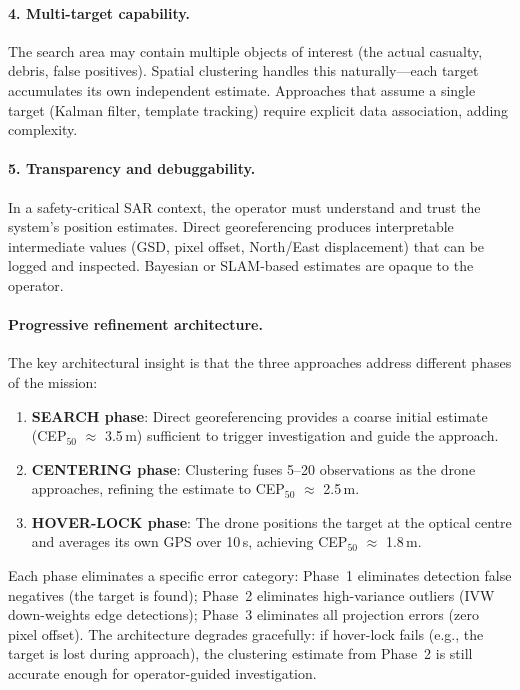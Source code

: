 \paragraph{4. Multi-target capability.}
The search area may contain multiple objects of interest (the actual casualty, debris, false positives).  Spatial clustering handles this naturally---each target accumulates its own independent estimate.  Approaches that assume a single target (Kalman filter, template tracking) require explicit data association, adding complexity.

\paragraph{5. Transparency and debuggability.}
In a safety-critical SAR context, the operator must understand and trust the system's position estimates.  Direct georeferencing produces interpretable intermediate values (GSD, pixel offset, North/East displacement) that can be logged and inspected.  Bayesian or SLAM-based estimates are opaque to the operator.

\paragraph{Progressive refinement architecture.}
The key architectural insight is that the three approaches address different phases of the mission:

\begin{enumerate}
  \item \textbf{SEARCH phase}: Direct georeferencing provides a coarse initial estimate (CEP$_{50}$ $\approx$ 3.5\,m) sufficient to trigger investigation and guide the approach.
  \item \textbf{CENTERING phase}: Clustering fuses 5--20 observations as the drone approaches, refining the estimate to CEP$_{50}$ $\approx$ 2.5\,m.
  \item \textbf{HOVER-LOCK phase}: The drone positions the target at the optical centre and averages its own GPS over 10\,s, achieving CEP$_{50}$ $\approx$ 1.8\,m.
\end{enumerate}

\noindent Each phase eliminates a specific error category: Phase~1 eliminates detection false negatives (the target is found); Phase~2 eliminates high-variance outliers (IVW down-weights edge detections); Phase~3 eliminates all projection errors (zero pixel offset).  The architecture degrades gracefully: if hover-lock fails (e.g., the target is lost during approach), the clustering estimate from Phase~2 is still accurate enough for operator-guided investigation.

